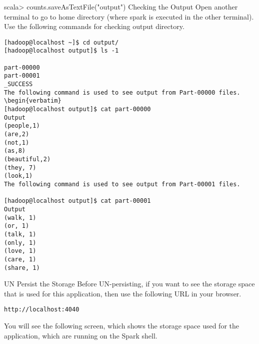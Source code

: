 \documentclass[a4paper,12pt]{article}
\begin{document}
scala> counts.saveAsTextFile("output")
Checking the Output
Open another terminal to go to home directory (where spark is executed in the other terminal). Use the following commands for checking output directory.
\begin{verbatim}
[hadoop@localhost ~]$ cd output/ 
[hadoop@localhost output]$ ls -1 
 
part-00000 
part-00001 
_SUCCESS
The following command is used to see output from Part-00000 files.
\begin{verbatim}
[hadoop@localhost output]$ cat part-00000
Output
(people,1) 
(are,2) 
(not,1) 
(as,8) 
(beautiful,2) 
(they, 7) 
(look,1) 
The following command is used to see output from Part-00001 files.

[hadoop@localhost output]$ cat part-00001 
Output
(walk, 1) 
(or, 1) 
(talk, 1) 
(only, 1) 
(love, 1) 
(care, 1) 
(share, 1)     
\end{verbatim}

UN Persist the Storage
Before UN-persisting, if you want to see the storage space that is used for this application, then use the following URL in your browser.
\begin{verbatim}
http://localhost:4040
\end{verbatim}
You will see the following screen, which shows the storage space used for the application, which are running on the Spark shell.
\end{document}
